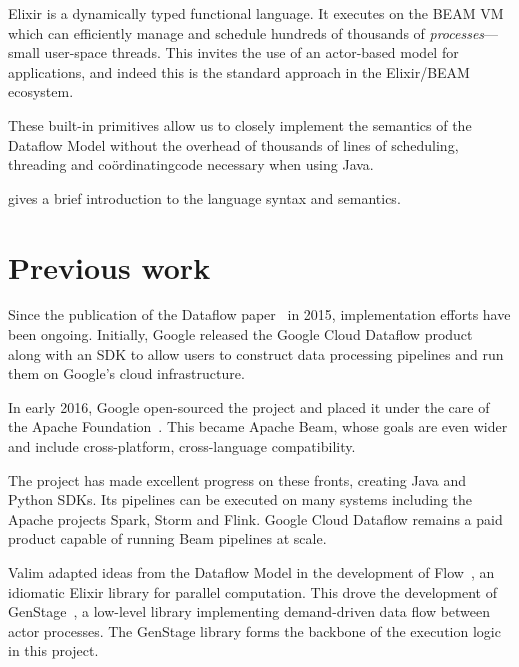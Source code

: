 Elixir is a dynamically typed functional language. 
It executes on the BEAM VM which can efficiently manage and schedule hundreds of thousands of \emph{processes}---small user-space threads.
This invites the use of an actor-based model for applications, and indeed this is the standard approach in the Elixir/BEAM ecosystem.

These built-in primitives allow us to closely implement the semantics of the Dataflow Model without the overhead of thousands of lines of scheduling, threading and co\"ordinating\footnotemark[1] code necessary when using Java.


 gives a brief introduction to the language syntax and semantics.

\section{Previous work}\label{sec:intro:previous}
Since the publication of the Dataflow paper~\cite{Akidau:2015} in 2015, implementation efforts have been ongoing.
Initially, Google released the Google Cloud Dataflow product~\cite{CloudDataflow} along with an SDK to allow users to construct data processing pipelines and run them on Google's cloud infrastructure.

In early 2016, Google open-sourced the project and placed it under the care of the Apache Foundation~\cite{ApacheDataflowPost}.
This became Apache Beam, whose goals are even wider and include cross-platform, cross-language compatibility.

The project has made excellent progress on these fronts, creating Java and Python SDKs.
Its pipelines can be executed on many systems including the Apache projects Spark, Storm and Flink.
Google Cloud Dataflow remains a paid product capable of running Beam pipelines at scale.

Valim adapted ideas from the Dataflow Model in the development of Flow~\cite{ElixirFlow}, an idiomatic Elixir library for parallel computation.
This drove the development of GenStage~\cite{ElixirGenStage}, a low-level library implementing demand-driven data flow between actor processes.
The GenStage library forms the backbone of the execution logic in this project.

